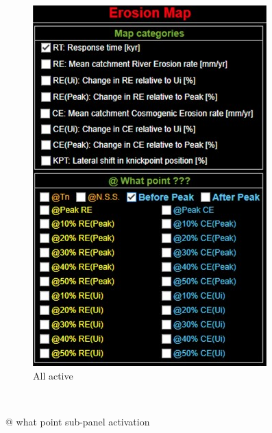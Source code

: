 \documentclass[11pt,a4paper,titlepage]{report}
\begin{document}
\begin{figure}[H]
\begin{subfigure}[H]{0.3\textwidth}
        \includegraphics[width=\textwidth]{mcwp3.jpg}
        \caption{All active}
    \end{subfigure}\\    
    \caption["@ what point" sub-panel activation]{@ what point sub-panel activation}
    \label{fig:mc_active}    
\end{figure}
\end{document}
